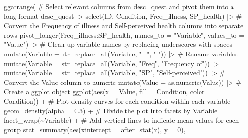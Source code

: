 \documentclass[
  bookmarksnumbered]{article}
\newenvironment{Shaded}{\begin{snugshade}}{\end{snugshade}}
\newcommand{\AttributeTok}[1]{\textcolor[rgb]{0.80,0.80,0.80}{#1}}
\newcommand{\CommentTok}[1]{\textcolor[rgb]{0.50,0.62,0.50}{#1}}
\newcommand{\DecValTok}[1]{\textcolor[rgb]{0.86,0.86,0.80}{#1}}
\newcommand{\FloatTok}[1]{\textcolor[rgb]{0.75,0.75,0.82}{#1}}
\newcommand{\FunctionTok}[1]{\textcolor[rgb]{0.94,0.94,0.56}{#1}}
\newcommand{\NormalTok}[1]{\textcolor[rgb]{0.80,0.80,0.80}{#1}}
\newcommand{\SpecialCharTok}[1]{\textcolor[rgb]{0.86,0.64,0.64}{#1}}
\newcommand{\StringTok}[1]{\textcolor[rgb]{0.80,0.58,0.58}{#1}}
\begin{document}
\begin{Shaded}
\begin{Highlighting}[]
\FunctionTok{ggarrange}\NormalTok{(}
  \CommentTok{\# Select relevant columns from desc\_quest and pivot them into a long format }
\NormalTok{  desc\_quest }\SpecialCharTok{|\textgreater{}}
    \FunctionTok{select}\NormalTok{(ID, Condition, Freq\_illness, SP\_health) }\SpecialCharTok{|\textgreater{}}
    \CommentTok{\# Convert the Frequency of illness and Self{-}perceived health columns into separate rows}
    \FunctionTok{pivot\_longer}\NormalTok{(Freq\_illness}\SpecialCharTok{:}\NormalTok{SP\_health,}
                 \AttributeTok{names\_to =} \StringTok{"Variable"}\NormalTok{,}
                 \AttributeTok{values\_to =} \StringTok{"Value"}\NormalTok{) }\SpecialCharTok{|\textgreater{}} 
    \CommentTok{\# Clean up variable names by replacing underscores with spaces}
    \FunctionTok{mutate}\NormalTok{(}\AttributeTok{Variable =} \FunctionTok{str\_replace\_all}\NormalTok{(Variable, }\StringTok{"\_"}\NormalTok{, }\StringTok{" "}\NormalTok{)) }\SpecialCharTok{|\textgreater{}}
    \CommentTok{\# Rename variables}
    \FunctionTok{mutate}\NormalTok{(}\AttributeTok{Variable =} \FunctionTok{str\_replace\_all}\NormalTok{(Variable, }\StringTok{"Freq"}\NormalTok{, }\StringTok{"Frequency of"}\NormalTok{)) }\SpecialCharTok{|\textgreater{}}
    \FunctionTok{mutate}\NormalTok{(}\AttributeTok{Variable =} \FunctionTok{str\_replace\_all}\NormalTok{(Variable, }\StringTok{"SP"}\NormalTok{, }\StringTok{"Self{-}perceived"}\NormalTok{)) }\SpecialCharTok{|\textgreater{}}
    \CommentTok{\# Convert the Value column to numeric}
    \FunctionTok{mutate}\NormalTok{(}\AttributeTok{Value =} \FunctionTok{as.numeric}\NormalTok{(Value)) }\SpecialCharTok{|\textgreater{}} 
    \CommentTok{\# Create a ggplot object}
    \FunctionTok{ggplot}\NormalTok{(}\FunctionTok{aes}\NormalTok{(}\AttributeTok{x =}\NormalTok{ Value, }\AttributeTok{fill =}\NormalTok{ Condition, }\AttributeTok{color =}\NormalTok{ Condition)) }\SpecialCharTok{+}
    \CommentTok{\# Plot density curves for each condition within each variable}
    \FunctionTok{geom\_density}\NormalTok{(}\AttributeTok{alpha =} \FloatTok{0.3}\NormalTok{) }\SpecialCharTok{+}
    \CommentTok{\# Divide the plot into facets by Variable}
    \FunctionTok{facet\_wrap}\NormalTok{(}\SpecialCharTok{\textasciitilde{}}\NormalTok{Variable) }\SpecialCharTok{+}
    \CommentTok{\# Add vertical lines to indicate mean values for each group}
    \FunctionTok{stat\_summary}\NormalTok{(}\FunctionTok{aes}\NormalTok{(}\AttributeTok{xintercept =} \FunctionTok{after\_stat}\NormalTok{(x), }\AttributeTok{y =} \DecValTok{0}\NormalTok{),}

\end{Highlighting}
\end{Shaded}
\end{document}
